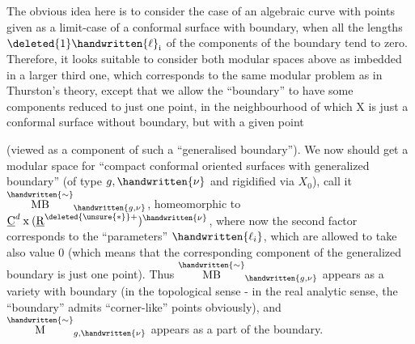 The obvious idea here is to consider the case of an algebraic curve with \handwritten{$\nu$} points given as a limit-case of a  conformal surface with boundary, when all the lengths $\deleted{1}\handwritten{\ell}_{\mathrm i}$ of the components of the boundary tend to zero. Therefore, it looks suitable to consider both modular spaces above as imbedded in a larger third one, which corresponds to the same modular problem as in Thurston's theory, except that we allow the ``boundary'' to have some components reduced to just one point, in the neighbourhood of which X is just a conformal surface without boundary, but with a given point


(viewed as a component of such a ``generalised boundary''). We now should  get a modular space for ``compact conformal oriented surfaces with generalized boundary'' (of type $g,\handwritten{\nu}$ and rigidified via $X_0$), call it $\overset{\handwritten{\sim}}{\mathrm{MB}}_{\handwritten{g,\nu}}$, homeomorphic to $\underline{\mathrm C}^d\mathbin{\mathrm x}(\underline{\mathrm R}^{\deleted{\unsure{*}}+})^{\handwritten{\nu}}$, where now the second factor corresponds to  the ``parameters'' $\handwritten{\ell_i}$, which are allowed to take also value 0 (which means that the corresponding component of the generalized boundary is just one point). Thus $\overset{\handwritten{\sim}}{\mathrm{MB}}_{\handwritten{g,\nu}}$ appears as a variety with boundary (in the topological sense - in the real analytic sense, the ``boundary'' admits ``corner-like'' points obviously), and $\overset{\handwritten{\sim}}{\mathrm M}_{g,\handwritten{\nu}}$ appears as a part of the boundary.

